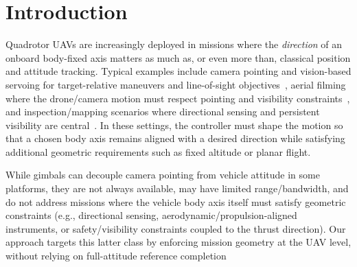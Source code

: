\documentclass[letterpaper, 10 pt, conference]{ieeeconf}
\begin{document}


\section{Introduction}\label{sec:intro}
Quadrotor UAVs are increasingly deployed in missions where the \emph{direction} of an onboard body-fixed axis matters as much as, or even more than, classical position and attitude tracking. Typical examples include camera pointing and vision-based servoing for target-relative maneuvers and line-of-sight objectives~\cite{Thomas2016RAL,Sheckells2016IROS,HamelMahony2002TRO}, aerial filming where the drone/camera motion must respect pointing and visibility constraints~\cite{Sabetghadam2019ECMR}, and inspection/mapping scenarios where directional sensing and persistent visibility are central~\cite{9636824,yang2024safety}. In these settings, the controller must shape the motion so that a chosen body axis remains aligned with a desired direction while satisfying additional geometric requirements such as fixed altitude or planar flight.

While gimbals can decouple camera pointing from vehicle attitude in some platforms, they are not always available, may have limited range/bandwidth, and do not address missions where the vehicle body axis itself must satisfy geometric constraints (e.g., directional sensing, aerodynamic/propulsion-aligned instruments, or safety/visibility constraints coupled to the thrust direction). Our approach targets this latter class by enforcing mission geometry at the UAV level, without relying on full-attitude reference completion
\end{document}
